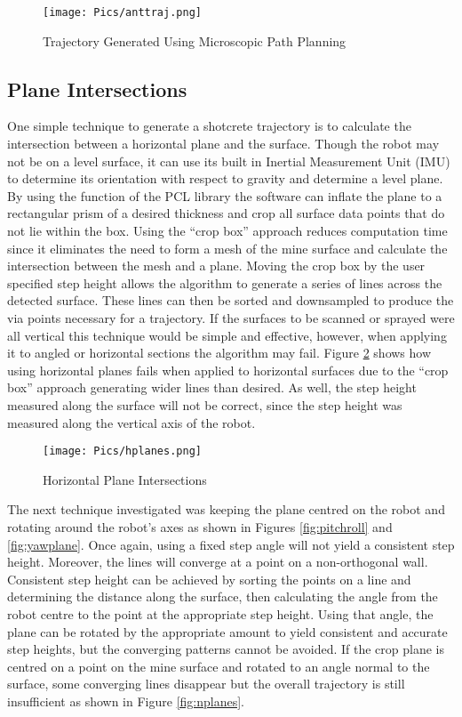 \begin{figure}[h]
    \centering
    \texttt{[image: Pics/anttraj.png]}
    \caption{Trajectory Generated Using Microscopic Path Planning}
    \label{fig:anttraj}
\end{figure}

\subsection{Plane Intersections}

One simple technique to generate a shotcrete trajectory is to calculate the intersection between a horizontal plane and the surface. Though the robot may not be on a level surface, it can use its built in Inertial Measurement Unit (IMU) to determine its orientation with respect to gravity and determine a level plane. By using the  function of the PCL library the software can inflate the plane to a rectangular prism of a desired thickness and crop all surface data points that do not lie within the box. Using the ``crop box'' approach reduces computation time since it eliminates the need to form a mesh of the mine surface and calculate the intersection between the mesh and a plane. Moving the crop box by the user specified step height allows the algorithm to generate a series of lines across the detected surface. These lines can then be sorted and downsampled to produce the via points necessary for a trajectory. If the surfaces to be scanned or sprayed were all vertical this technique would be simple and effective, however, when applying it to angled or horizontal sections the algorithm may fail. Figure \ref{fig:hplanes} shows how using horizontal planes fails when applied to horizontal surfaces due to the ``crop box'' approach generating wider lines than desired. As well, the step height measured along the surface will not be correct, since the step height was measured along the vertical axis of the robot.\\

\begin{figure}[h]
    \centering
    \texttt{[image: Pics/hplanes.png]}
    \caption{Horizontal Plane Intersections}
    \label{fig:hplanes}
\end{figure}
The next technique investigated was keeping the plane centred on the robot and rotating around the robot's axes as shown in Figures \ref{fig:pitchroll} and \ref{fig:yawplane}. Once again, using a fixed step angle will not yield a consistent step height. Moreover, the lines will converge at a point on a non-orthogonal wall. Consistent step height can be achieved by sorting the points on a line and determining the distance along the surface, then calculating the angle from the robot centre to the point at the appropriate step height. Using that angle, the plane can be rotated by the appropriate amount to yield consistent and accurate step heights, but the converging patterns cannot be avoided. If the crop plane is centred on a point on the mine surface and rotated to an angle normal to the surface, some converging lines disappear but the overall trajectory is still insufficient as shown in Figure \ref{fig:nplanes}. \\

